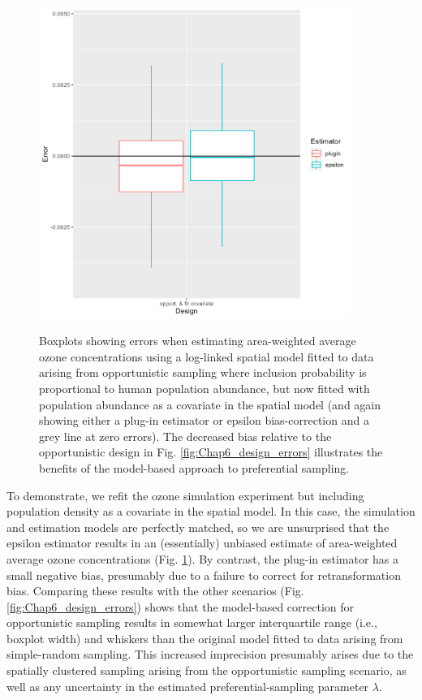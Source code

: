 \begin{figure}[!ht]
    \caption[Errors with model-based approach for preferential sampling]{Boxplots showing errors when estimating area-weighted average ozone concentrations using a log-linked spatial model fitted to data arising from opportunistic sampling where inclusion probability is proportional to human population abundance, but now fitted with population abundance as a covariate in the spatial model (and again showing either a plug-in estimator or epsilon bias-correction and a grey line at zero errors). The decreased bias relative to the opportunistic design in Fig. \ref{fig:Chap6_design_errors} illustrates the benefits of the model-based approach to preferential sampling.}
    \centering
    \includegraphics[width=4in]{Chap_6/Preferential_sampling.png}
    \label{fig:Chap6_preferential sampling}
\end{figure}

To demonstrate, we refit the ozone simulation experiment but including population density as a covariate in the spatial model.  In this case, the simulation and estimation models are perfectly matched, so we are unsurprised that the epsilon estimator results in an (essentially) unbiased estimate of area-weighted average ozone concentrations (Fig. \ref{fig:Chap6_preferential sampling}).  By contrast, the plug-in estimator has a small negative bias, presumably due to a failure to correct for retransformation bias.  Comparing these results with the other scenarios (Fig. \ref{fig:Chap6_design_errors}) shows that the model-based correction for opportunistic sampling results in somewhat larger interquartile range (i.e., boxplot width) and whiskers than the original model fitted to data arising from simple-random sampling.  This increased imprecision presumably arises due to the spatially clustered sampling arising from the opportunistic sampling scenario, as well as any uncertainty in the estimated preferential-sampling parameter \(\lambda\).  

